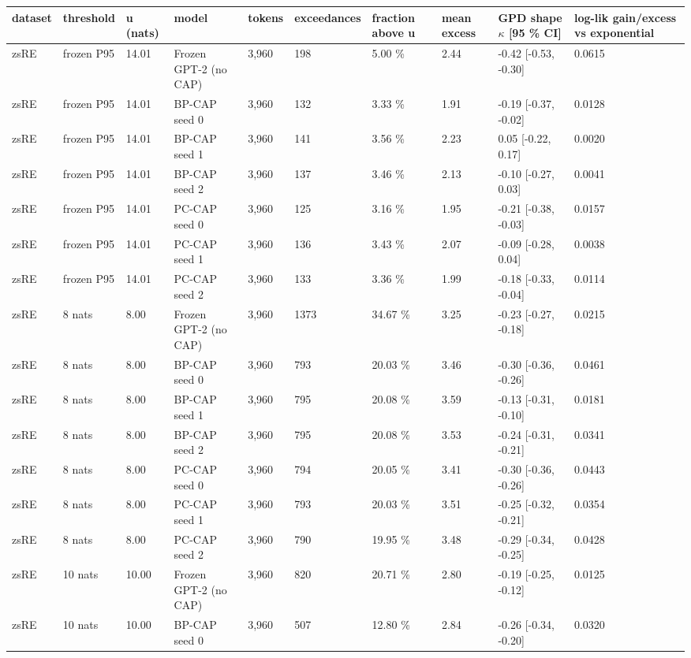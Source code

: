 \documentclass[10pt,a4paper]{article}
\begin{document}
\begin{center}\tiny
\begin{tabularx}{\textwidth}{@{}p{}XXXXXXXXX@{}}
\toprule
dataset & threshold & u (nats) & model & tokens & exceedances & fraction above u & mean excess & GPD shape $\kappa$ [95 \% CI] & log-lik gain/excess vs exponential \\ \midrule
zsRE & frozen P95 & 14.01 & Frozen GPT-2 (no CAP) & 3,960 & 198 & 5.00 \% & 2.44 & -0.42 [-0.53, -0.30] & 0.0615 \\
zsRE & frozen P95 & 14.01 & BP-CAP seed 0 & 3,960 & 132 & 3.33 \% & 1.91 & -0.19 [-0.37, -0.02] & 0.0128 \\
zsRE & frozen P95 & 14.01 & BP-CAP seed 1 & 3,960 & 141 & 3.56 \% & 2.23 & 0.05 [-0.22, 0.17] & 0.0020 \\
zsRE & frozen P95 & 14.01 & BP-CAP seed 2 & 3,960 & 137 & 3.46 \% & 2.13 & -0.10 [-0.27, 0.03] & 0.0041 \\
zsRE & frozen P95 & 14.01 & PC-CAP seed 0 & 3,960 & 125 & 3.16 \% & 1.95 & -0.21 [-0.38, -0.03] & 0.0157 \\
zsRE & frozen P95 & 14.01 & PC-CAP seed 1 & 3,960 & 136 & 3.43 \% & 2.07 & -0.09 [-0.28, 0.04] & 0.0038 \\
zsRE & frozen P95 & 14.01 & PC-CAP seed 2 & 3,960 & 133 & 3.36 \% & 1.99 & -0.18 [-0.33, -0.04] & 0.0114 \\
zsRE & 8 nats & 8.00 & Frozen GPT-2 (no CAP) & 3,960 & 1373 & 34.67 \% & 3.25 & -0.23 [-0.27, -0.18] & 0.0215 \\
zsRE & 8 nats & 8.00 & BP-CAP seed 0 & 3,960 & 793 & 20.03 \% & 3.46 & -0.30 [-0.36, -0.26] & 0.0461 \\
zsRE & 8 nats & 8.00 & BP-CAP seed 1 & 3,960 & 795 & 20.08 \% & 3.59 & -0.13 [-0.31, -0.10] & 0.0181 \\
zsRE & 8 nats & 8.00 & BP-CAP seed 2 & 3,960 & 795 & 20.08 \% & 3.53 & -0.24 [-0.31, -0.21] & 0.0341 \\
zsRE & 8 nats & 8.00 & PC-CAP seed 0 & 3,960 & 794 & 20.05 \% & 3.41 & -0.30 [-0.36, -0.26] & 0.0443 \\
zsRE & 8 nats & 8.00 & PC-CAP seed 1 & 3,960 & 793 & 20.03 \% & 3.51 & -0.25 [-0.32, -0.21] & 0.0354 \\
zsRE & 8 nats & 8.00 & PC-CAP seed 2 & 3,960 & 790 & 19.95 \% & 3.48 & -0.29 [-0.34, -0.25] & 0.0428 \\
zsRE & 10 nats & 10.00 & Frozen GPT-2 (no CAP) & 3,960 & 820 & 20.71 \% & 2.80 & -0.19 [-0.25, -0.12] & 0.0125 \\
zsRE & 10 nats & 10.00 & BP-CAP seed 0 & 3,960 & 507 & 12.80 \% & 2.84 & -0.26 [-0.34, -0.20] & 0.0320 \\

\end{tabularx}
\end{center}
\end{document}
